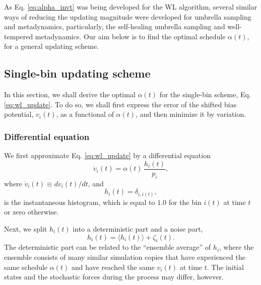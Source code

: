 \documentclass[reprint, floatfix]{revtex4-1}
\begin{document}
As Eq. \eqref{eq:alpha_invt} was being developed for the WL algorithm,
several similar ways of
reducing the updating magnitude
were developed for umbrella sampling and metadynamics,
particularly, the self-healing umbrella sampling
and well-tempered metadynamics\cite{
  marsili2006, barducci2008, dickson2011, dama2014}.
%
Our aim below is to find the optimal schedule $\alpha(t)$,
for a general updating scheme.




\subsection{\label{sec:single-bin}
Single-bin updating scheme}



In this section,
we shall derive the optimal $\alpha(t)$
for the single-bin scheme,
Eq. \eqref{eq:wl_update}.
%
To do so,
we shall first express the error of
the shifted bias potential, $v_i(t)$,
as a functional of $\alpha(t)$,
and then minimize it by variation.



\subsubsection{Differential equation}



We first approximate Eq. \eqref{eq:wl_update}
by a differential equation
%
\begin{equation}
  \dot v_i(t)
  =
  \alpha(t) \, \frac{ h_i(t) } { p_i },
  \label{eq:vt_diffeq}
\end{equation}
%
where
$\dot v_i(t) \equiv dv_i(t)/dt$,
%
and
\begin{equation}
  h_i(t) = \delta_{i, i(t)}
  ,
  \label{eq:h_def}
\end{equation}
is the instantaneous histogram,
which is equal to $1.0$
for the bin $i(t)$ at time $t$
or zero otherwise.



Next, we split $h_i(t)$ into a deterministic part
and a noise part,
%
\begin{equation}
  h_i(t) = \langle h_i(t) \rangle + \zeta_i(t).
  \label{eq:h_split}
\end{equation}
%
The deterministic part can be related
to the ``ensemble average'' of $h_i$,
where the ensemble consists of many similar simulation copies
that have experienced the same schedule $\alpha(t)$
and have reached the same $v_i(t)$
at time $t$.
%
The initial states and the stochastic forces
during the process may differ, however.
\end{document}
